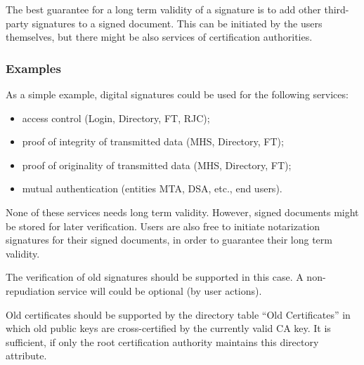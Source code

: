 The best guarantee for a long term validity of a signature is
to add other third-party signatures to a signed document.
This can be initiated by the users themselves,
but there might be also services of certification authorities.

\subsubsection{Examples}
\label{ops-dfn}

As a simple example, digital signatures could be used for the following services:

\begin{itemize}
\item access control (Login, Directory, FT, RJC);
\item proof of integrity of transmitted data (MHS, Directory, FT);
\item proof of originality of transmitted data (MHS, Directory, FT);
\item mutual authentication (entities MTA, DSA, etc., end users).
\end{itemize}

None of these services needs long term validity.
However, signed documents might be stored for later verification.
Users are also free to initiate notarization signatures for their
signed documents, in order to guarantee their long term validity.

The verification of old signatures should be supported in this case.
A non-repudiation service will could be optional
(by user actions).

Old certificates should be supported by the directory table ``Old Certificates''
in which old public keys are cross-certified by the currently valid CA key.
It is sufficient, if only the root certification authority
maintains this directory attribute.
